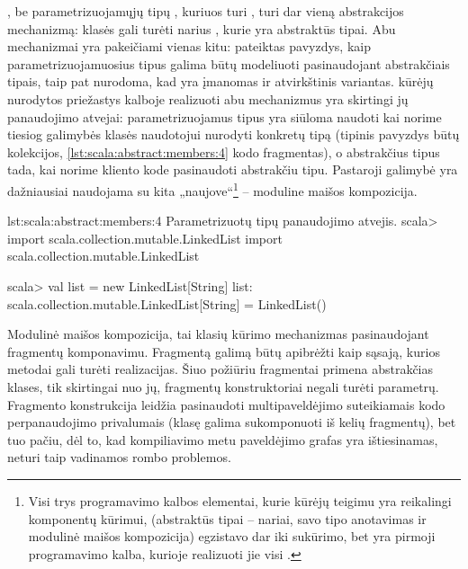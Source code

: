 , be parametrizuojamųjų tipų , kuriuos
turi , turi dar vieną abstrakcijos mechanizmą:
 klasės gali turėti narius , kurie
yra abstraktūs tipai. Abu mechanizmai yra pakeičiami vienas kitu:
\cite[10]{scala-overview} pateiktas pavyzdys, kaip parametrizuojamuosius
tipus galima būtų modeliuoti pasinaudojant abstrakčiais tipais, taip
pat nurodoma, kad yra įmanomas ir atvirkštinis variantas.
 kūrėjų \cite[11]{scala-overview} nurodytos
priežastys kalboje realizuoti abu mechanizmus yra skirtingi jų
panaudojimo atvejai: parametrizuojamus tipus yra siūloma naudoti kai
norime tiesiog galimybės klasės naudotojui nurodyti konkretų tipą
(tipinis pavyzdys būtų kolekcijos, \ref{lst:scala:abstract:members:4}
kodo fragmentas), o abstrakčius tipus tada, kai norime kliento kode
pasinaudoti abstrakčiu tipu. Pastaroji galimybė yra dažniausiai
naudojama su kita  „naujove“\footnote{
Visi trys programavimo kalbos elementai, kurie 
kūrėjų teigimu yra reikalingi komponentų kūrimui, (abstraktūs
tipai – nariai, savo tipo anotavimas ir modulinė maišos kompozicija)
egzistavo dar iki  sukūrimo, bet 
yra pirmoji programavimo kalba, kurioje realizuoti jie visi
\cite[2]{scalable-component-abstractions}.} – moduline maišos
kompozicija.

\begin{scalailisting}{lst:scala:abstract:members:4}{%
  Parametrizuotų tipų panaudojimo atvejis.}
scala> import scala.collection.mutable.LinkedList
import scala.collection.mutable.LinkedList

scala> val list = new LinkedList[String]
list: scala.collection.mutable.LinkedList[String] = LinkedList()

\end{scalailisting}

Modulinė maišos kompozicija, tai klasių kūrimo mechanizmas
pasinaudojant fragmentų  komponavimu. Fragmentą galimą
būtų apibrėžti kaip sąsają, kurios metodai gali turėti
realizacijas. Šiuo požiūriu fragmentai primena abstrakčias klases,
tik skirtingai nuo jų, fragmentų konstruktoriai negali turėti
parametrų. Fragmento konstrukcija leidžia pasinaudoti
multipaveldėjimo suteikiamais kodo perpanaudojimo privalumais
(klasę galima sukomponuoti iš kelių fragmentų), bet tuo pačiu, dėl
to, kad kompiliavimo metu paveldėjimo grafas yra ištiesinamas, neturi
taip vadinamos rombo problemos.

